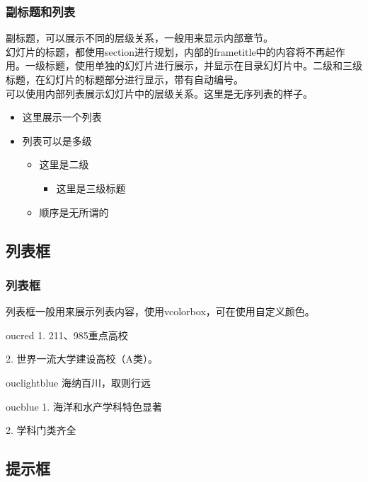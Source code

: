 \documentclass[aspectratio=169,UTF8,t]{beamer}%
\begin{document}
\begin{frame}
    \frametitle{副标题和列表}
    副标题，可以展示不同的层级关系，一般用来显示内部章节。\\
    幻灯片的标题，都使用section进行规划，内部的frametitle中的内容将不再起作用。一级标题，使用单独的幻灯片进行展示，并显示在目录幻灯片中。二级和三级标题，在幻灯片的标题部分进行显示，带有自动编号。\\
    可以使用内部列表展示幻灯片中的层级关系。这里是无序列表的样子。
    \begin{itemize}
        \item 这里展示一个列表 
        \item 列表可以是多级
        \begin{itemize}
            \item 这里是二级
            \begin{itemize}
                \item 这里是三级标题
            \end{itemize}
            \item 顺序是无所谓的
        \end{itemize}
    \end{itemize}
\end{frame}

\subsection{列表框}

\begin{frame}
    \frametitle{列表框}
    列表框一般用来展示列表内容，使用vcolorbox，可在使用自定义颜色。
    \begin{vcolorbox}[中国海洋大学]{oucred}
        1. 211、985重点高校

        2. 世界一流大学建设高校（A类）。
    \end{vcolorbox}
    \begin{vcolorbox}[学校校训]{ouclightblue}
        海纳百川，取则行远
    \end{vcolorbox}
    \begin{vcolorbox}[学校特色]{oucblue}
        1. 海洋和水产学科特色显著
        
        2. 学科门类齐全
    \end{vcolorbox}
\end{frame}

\subsection{提示框}
\end{document}

